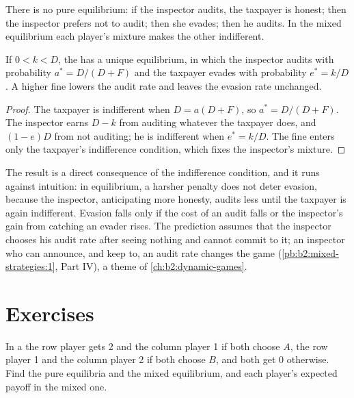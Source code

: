 There is no pure equilibrium: if the inspector audits, the taxpayer is honest; then the inspector prefers
not to audit; then she evades; then he audits. In the mixed equilibrium each player's mixture makes the
other indifferent.

\begin{proposition}\label{prop:b2:mixed-strategies:inspection}
If $0 < k < D$, the  has a unique equilibrium, in which the inspector audits with probability
$a^* = D/(D + F)$ and the taxpayer evades with probability $e^* = k/D$. A higher fine lowers the audit rate and
leaves the evasion rate unchanged.
\end{proposition}

\begin{proof}
The taxpayer is indifferent when $D = a(D + F)$, so $a^* = D/(D + F)$. The inspector earns $D - k$ from auditing
whatever the taxpayer does, and $(1 - e)D$ from not auditing; he is indifferent when $e^* = k/D$. The fine enters
only the taxpayer's indifference condition, which fixes the inspector's mixture.
\end{proof}

The result is a direct consequence of the indifference condition, and it runs against intuition: in
equilibrium, a harsher penalty does not deter evasion, because the inspector, anticipating more honesty,
audits less until the taxpayer is again indifferent. Evasion falls only if the cost of an audit falls or the
inspector's gain from catching an evader rises. The prediction assumes that the inspector chooses his audit
rate after seeing nothing and cannot commit to it; an inspector who can announce, and keep to, an audit rate
changes the game (\cref{pb:b2:mixed-strategies:1}, Part IV), a theme of \cref{ch:b2:dynamic-games}.

\section{Exercises}\label{sec:b2:mixed-strategies:exercises}

\begin{exercise}[$\star$]\label{exo:b2:mixed-strategies:1}
In a  the row player gets 2 and the column player 1 if both choose $A$, the row player 1 and the
column player 2 if both choose $B$, and both get 0 otherwise. Find the pure equilibria and the mixed
equilibrium, and each player's expected payoff in the mixed one.
\end{exercise}

